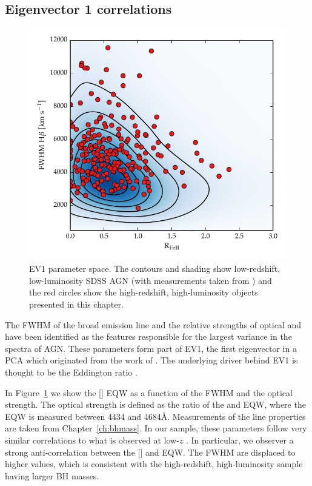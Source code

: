 \subsection{Eigenvector 1 correlations}

\begin{figure}
    \includegraphics[width=\columnwidth]{figures/chapter04/ev1_lowz.pdf} 
    \caption[{\ac{EV1} parameter space.}]{\ac{EV1} parameter space. The contours and shading show low-redshift, low-luminosity SDSS \ac{AGN} (with measurements taken from \citet{shen11}) and the red circles show the high-redshift, high-luminosity objects presented in this chapter.}      
    \label{fig:ev1_lowz}
\end{figure}

The \ac{FWHM} of the broad \hb emission line and the relative strengths of optical  and \hb have been identified as the features responsible for the largest variance in the spectra of \ac{AGN}. 
These parameters form part of \ac{EV1}, the first eigenvector in a \ac{PCA} which originated from the work of \citet{boroson92}.   
The underlying driver behind EV1 is thought to be the Eddington ratio \citep[e.g.][]{sulentic00b,shen14}. 

In Figure~\ref{fig:ev1_lowz} we show the [] \ac{EQW} as a function of the \hb \ac{FWHM} and the optical  strength. 
The optical  strength is defined as the ratio of the  and \hb \ac{EQW}, where the  \ac{EQW} is measured between 4434 and 4684\AA.
Measurements of the \hb line properties are taken from Chapter~\ref{ch:bhmass}. 
In our sample, these parameters follow very similar correlations to what is observed at low-$z$ \citep[see also][]{sulentic04, shen16a}.
In particular, we observer a strong anti-correlation between the [] and  \ac{EQW}.  
The \hb \ac{FWHM} are displaced to higher values, which is consistent with the high-redshift, high-luminosity sample having larger \ac{BH} masses. 


